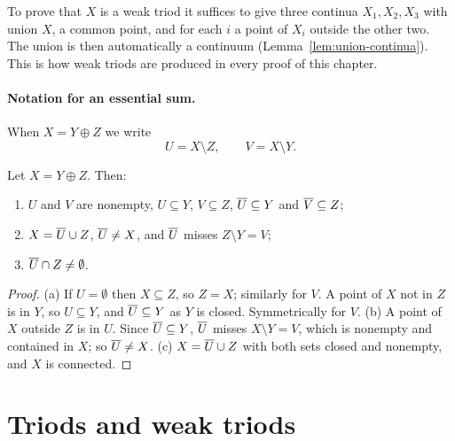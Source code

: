 
To prove that $X$ is a weak triod it suffices to give three continua $X_1,X_2,X_3$ with union $X$,
a common point, and for each $i$ a point of $X_i$ outside the other two. The union is then
automatically a continuum (Lemma~\ref{lem:union-continua}). This is how weak triods are produced in
every proof of this chapter.

\paragraph{Notation for an essential sum.} When $X=Y\oplus Z$ we write
\[
U=X\setminus Z,\qquad V=X\setminus Y .
\]

\begin{lemma}\label{lem:esum-basic}
Let $X=Y\oplus Z$. Then:
\begin{enumerate}[label=(\alph*)]
\item $U$ and $V$ are nonempty, $U\subseteq Y$, $V\subseteq Z$, $\overline{U}\subseteq Y$ and $\overline{V}\subseteq Z$;
\item $X=\overline{U}\cup Z$, $\overline{U}\ne X$, and $\overline{U}$ misses $Z\setminus Y=V$;
\item $\overline{U}\cap Z\ne\emptyset$.
\end{enumerate}
\end{lemma}

\begin{proof}
(a) If $U=\emptyset$ then $X\subseteq Z$, so $Z=X$; similarly for $V$. A point of $X$ not in $Z$ is in
$Y$, so $U\subseteq Y$, and $\overline{U}\subseteq Y$ as $Y$ is closed. Symmetrically for $V$.
(b) A point of $X$ outside $Z$ is in $U$. Since $\overline{U}\subseteq Y$, $\overline{U}$ misses $X\setminus Y=V$, which
is nonempty and contained in $X$; so $\overline{U}\neq X$.
(c) $X=\overline{U}\cup Z$ with both sets closed and nonempty, and $X$ is connected.
\end{proof}


\section{Triods and weak triods}

